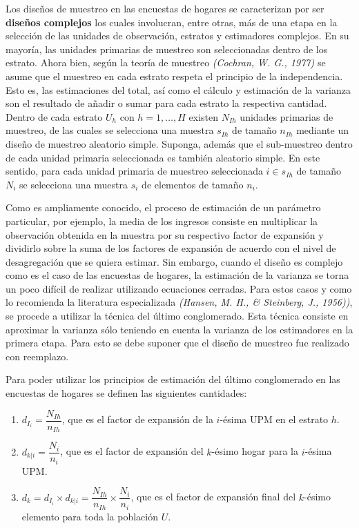 \documentclass[
  12pt,
]{book}
\begin{document}
Los diseños de muestreo en las encuestas de hogares se caracterizan por ser \textbf{diseños complejos} los cuales involucran, entre otras, más de una etapa en la selección de las unidades de observación, estratos y estimadores complejos. En su mayoría, las unidades primarias de muestreo son seleccionadas dentro de los estrato. Ahora bien, según la teoría de muestreo \emph{(Cochran, W. G., 1977)} se asume que el muestreo en cada estrato respeta el principio de la independencia. Esto es, las estimaciones del total, así como el cálculo y estimación de la varianza son el resultado de añadir o sumar para cada estrato la respectiva cantidad. Dentro de cada estrato \(U_h\) con \(h=1,\ldots, H\) existen \(N_{Ih}\) unidades primarias de muestreo, de las cuales se selecciona una muestra \(s_{Ih}\) de tamaño \(n_{Ih}\) mediante un diseño de muestreo aleatorio simple. Suponga, además que el sub-muestreo dentro de cada unidad primaria seleccionada es también aleatorio simple. En este sentido, para cada unidad primaria de muestreo seleccionada \(i\in s_{Ih}\) de tamaño \(N_i\) se selecciona una muestra \(s_i\) de elementos de tamaño \(n_i\).

Como es ampliamente conocido, el proceso de estimación de un parámetro particular, por ejemplo, la media de los ingresos consiste en multiplicar la observación obtenida en la muestra por su respectivo factor de expansión y dividirlo sobre la suma de los factores de expansión de acuerdo con el nivel de desagregación que se quiera estimar. Sin embargo, cuando el diseño es complejo como es el caso de las encuestas de hogares, la estimación de la varianza se torna un poco difícil de realizar utilizando ecuaciones cerradas. Para estos casos y como lo recomienda la literatura especializada \emph{(Hansen, M. H., \& Steinberg, J., 1956))}, se procede a utilizar la técnica del último conglomerado. Esta técnica consiste en aproximar la varianza sólo teniendo en cuenta la varianza de los
estimadores en la primera etapa. Para esto se debe suponer que el diseño de muestreo fue realizado con reemplazo.

Para poder utilizar los principios de estimación del último conglomerado en las encuestas de hogares se definen las siguientes cantidades:

\begin{enumerate}
\def\labelenumi{\arabic{enumi}.}
\item
  \(d_{I_i} = \dfrac{N_{Ih}}{n_{Ih}}\), que es el factor de expansión de la \(i\)-ésima UPM en el estrato \(h\).
\item
  \(d_{k|i} = \dfrac{N_{i}}{n_{i}}\), que es el factor de expansión del \(k\)-ésimo hogar para la \(i\)-ésima UPM.
\item
  \(d_k = d_{I_i} \times d_{k|i} = \dfrac{N_{Ih}}{n_{Ih}} \times \dfrac{N_{i}}{n_{i}}\), que es el factor de expansión final del \(k\)-ésimo elemento para toda la población \(U\).
\end{enumerate}
\end{document}

